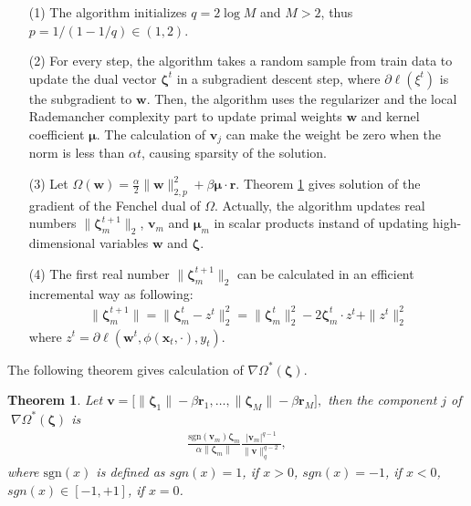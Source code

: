 \documentclass{article}
\newtheorem{theorem}{Theorem}
\begin{document}
\begin{itemize}
\item[(1)]The algorithm initializes $q=2\log M$ and $M>2$, thus $p=1/(1-1/q) \in (1,2)$.
\item[(2)] For every step, the algorithm takes a random sample from train data to update
    the dual vector $\mathbf{\zeta}^t$ in a subgradient descent step, where $\partial{\ell(\xi^t)}$ is the subgradient to $\mathbf{w}$.
    Then, the algorithm uses the regularizer and the local Rademancher complexity
    part to update primal weights $\mathbf{w}$ and kernel coefficient $\mathbf{\mu}$.
    The calculation of $\mathbf{v}_j$ can make the weight be zero when the norm is less than $\alpha t$,
    causing sparsity of the solution.
\item[(3)] Let $\Omega(\mathbf{w})=\frac{\alpha}{2}\|\mathbf{w}\|_{2,p}^2 + \beta\mathbf{\mu} \cdot \mathbf{r}$.
            Theorem \ref{theorem-fenchel-dual} gives solution of the gradient of the Fenchel dual of $\Omega$.
            Actually, the algorithm updates real numbers $\|\mathbf{\zeta}_m^{t+1}\|_2$, $\mathbf{v}_m$
            and $\mathbf{\mu}_m$ in scalar products instand of updating high-dimensional variables $\mathbf{w}$ and $\mathbf{\zeta}$.
 \item[(4)] The first real number $\|\mathbf{\zeta}_m^{t+1}\|_2$ can be calculated in an efficient incremental way as following:
            \begin{align*}
                \|\mathbf{\zeta}_m^{t+1}\|
                =\|\mathbf{\zeta}_m^{t}-z^t\|_2^2
                =\|\mathbf{\zeta}_m^{t}\|_2^2-2\mathbf{\zeta}_m^t \cdot z^t +\|z^t\|_2^2
            \end{align*}
            where $z^t=\partial\ell(\mathbf{w}^t,\phi(\mathbf{x}_t,\cdot), y_t)$.
 \end{itemize}

 The following theorem gives calculation of $\nabla\Omega^\ast(\mathbf{\zeta})$.
 \begin{theorem}
\label{theorem-fenchel-dual}
Let
$
    \mathbf{v}=\Big[\|\mathbf{\zeta}_1\|-\beta\mathbf{r}_1,\ldots,
    \|\mathbf{\zeta}_M\|-\beta\mathbf{r}_M\Big],
$
then the component $j$ of $\;\nabla\Omega^\ast(\mathbf{\zeta})$ is
\begin{align*}
\frac{\mathrm{sgn}(\mathbf{v}_m) \mathbf{\zeta}_m}{\alpha\|\mathbf{\zeta}_m\|}
       \frac{|\mathbf{v}_m|^{q-1}}{\|\mathbf{v}\|_q^{q-2}},
\end{align*}
where $\mathrm{sgn}(x)$ is defined as
$sgn(x)=1$, if $x>0$, $sgn(x)=-1$, if $x<0$,
$sgn(x)\in[-1,+1]$, if $x=0$.
\end{theorem}
\end{document}
